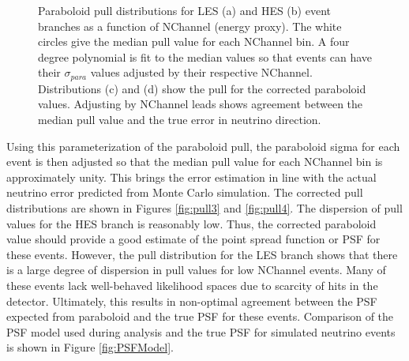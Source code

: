 \documentclass{gatech-thesis}
\begin{document}
\begin{figure}
\caption[Paraboloid Pull Distributions]{Paraboloid pull distributions for LES (a) and HES (b) event branches as a function of NChannel (energy proxy). The white circles give the median pull value for each NChannel bin. A four degree polynomial is fit to the median values so that events can have their $\sigma_{para}$ values adjusted by their respective NChannel. Distributions (c) and (d) show the pull for the corrected paraboloid values. Adjusting by NChannel leads shows agreement between the median pull value and the true error in neutrino direction.}
\label{fig:ParaboloidPull}
\end{figure}

Using this parameterization of the paraboloid pull, the paraboloid sigma for each event is then adjusted so that the median pull value for each NChannel bin is approximately unity. This brings the error estimation in line with the actual neutrino error predicted from Monte Carlo simulation. The corrected pull distributions are shown in Figures \ref{fig:pull3} and \ref{fig:pull4}. The dispersion of pull values for the HES branch is reasonably low. Thus, the corrected paraboloid value should provide a good estimate of the point spread function or PSF for these events. However, the pull distribution for the LES branch shows that there is a large degree of dispersion in pull values for low NChannel events. Many of these events lack well-behaved likelihood spaces due to scarcity of hits in the detector. Ultimately, this results in non-optimal agreement between the PSF expected from paraboloid and the true PSF for these events. Comparison of the PSF model used during analysis and the true PSF for simulated neutrino events is shown in Figure \ref{fig:PSFModel}.
\end{document}
